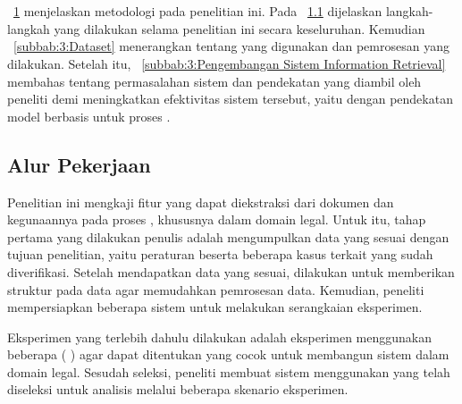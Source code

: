 \chapter{\babTiga}
\label{bab:3}
\bab{}~\ref{bab:3} menjelaskan metodologi pada penelitian ini. Pada \subbab{}~\ref{subbab:3:Alur Pekerjaan} dijelaskan langkah-langkah yang dilakukan selama penelitian ini secara keseluruhan.  Kemudian \subbab{}~\ref{subbab:3:Dataset} menerangkan tentang \dataset{} yang digunakan dan pemrosesan yang dilakukan. Setelah itu, \subbab{}~\ref{subbab:3:Pengembangan Sistem Information Retrieval} membahas tentang permasalahan sistem \ir{} dan pendekatan yang diambil oleh peneliti demi meningkatkan efektivitas sistem \ir{} tersebut, yaitu dengan pendekatan model \ml{} berbasis \hcf{} untuk proses \reranking{}.





\section{Alur Pekerjaan}
\label{subbab:3:Alur Pekerjaan}
Penelitian ini mengkaji fitur yang dapat diekstraksi dari dokumen dan kegunaannya pada proses \reranking{}, khususnya dalam domain legal. Untuk itu, tahap pertama yang dilakukan penulis adalah mengumpulkan data yang sesuai dengan tujuan penelitian, yaitu peraturan beserta beberapa kasus terkait yang sudah diverifikasi. Setelah mendapatkan data yang sesuai, dilakukan \parsing{} untuk memberikan struktur pada data agar memudahkan pemrosesan data. Kemudian, peneliti mempersiapkan beberapa sistem \ir{} untuk melakukan serangkaian eksperimen.

Eksperimen yang terlebih dahulu dilakukan adalah eksperimen menggunakan beberapa \txt{} \matching{} \alg{} (\base{} \retriever{}) agar dapat ditentukan yang cocok untuk membangun sistem \ir{} dalam domain legal. Sesudah seleksi, peneliti membuat sistem \ir{} menggunakan \base{} \retriever{} yang telah diseleksi untuk analisis melalui beberapa skenario eksperimen.

